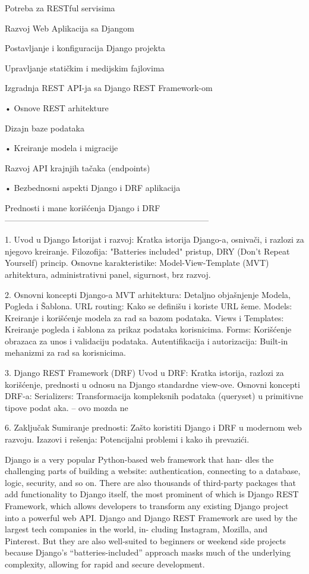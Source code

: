 \documentclass[12pt,oneside]{memoir}
\begin{document}
Potreba za RESTful servisima

Razvoj Web Aplikacija sa Djangom

Postavljanje i konfiguracija Django projekta

Upravljanje statičkim i medijskim fajlovima

Izgradnja REST API-ja sa Django REST Framework-om

• Osnove REST arhitekture

Dizajn baze podataka

• Kreiranje modela i migracije

Razvoj API krajnjih tačaka (endpoints)

• Bezbednosni aspekti Django i DRF aplikacija

Prednosti i mane korišćenja Django i DRF
--------------------------------------------------------------------------

1. Uvod u Django
Istorijat i razvoj: Kratka istorija Django-a, osnivači, i razlozi za njegovo kreiranje.
Filozofija: "Batteries included" pristup, DRY (Don't Repeat Yourself) princip.
Osnovne karakteristike: Model-View-Template (MVT) arhitektura, administrativni panel, sigurnost, brz razvoj.

2. Osnovni koncepti Django-a
MVT arhitektura: Detaljno objašnjenje Modela, Pogleda i Šablona.
URL routing: Kako se definišu i koriste URL šeme.
Models: Kreiranje i korišćenje modela za rad sa bazom podataka.
Views i Templates: Kreiranje pogleda i šablona za prikaz podataka korisnicima.
Forms: Korišćenje obrazaca za unos i validaciju podataka.
Autentifikacija i autorizacija: Built-in mehanizmi za rad sa korisnicima.

3. Django REST Framework (DRF)
Uvod u DRF: Kratka istorija, razlozi za korišćenje, prednosti u odnosu na Django standardne view-ove.
Osnovni koncepti DRF-a:
Serializers: Transformacija kompleksnih podataka (queryset) u primitivne tipove podat
aka. -- ovo mozda ne

6. Zaključak
Sumiranje prednosti: Zašto koristiti Django i DRF u modernom web razvoju.
Izazovi i rešenja: Potencijalni problemi i kako ih prevazići.



Django is a very popular Python-based web framework that han-
dles the challenging parts of building a website: authentication, connecting to a database, logic,
security, and so on. There are also thousands of third-party packages that add functionality to
Django itself, the most prominent of which is Django REST Framework, which allows developers
to transform any existing Django project into a powerful web API.
Django and Django REST Framework are used by the largest tech companies in the world, in-
cluding Instagram, Mozilla, and Pinterest. But they are also well-suited to beginners or weekend
side projects because Django’s “batteries-included” approach masks much of the underlying
complexity, allowing for rapid and secure development.
\end{document}
